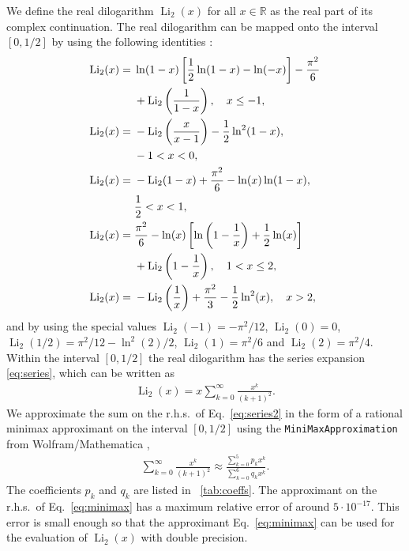 \documentclass[10pt,DIV16,twocolumn,numbers=noenddot]{scrartcl}
\newcommand{\Li}{\operatorname{Li}_2}
\newcommand{\tabref}[1]{\tablename~\ref{#1}}
\begin{document}
We define the real dilogarithm $\Li(x)$ for all $x\in\mathbb{R}$ as
the real part of its complex continuation.  The real dilogarithm can
be mapped onto the interval $[0,1/2]$ by using the following
identities \cite{lewin}:
%
\begin{align}
  \Li(x) ={}& \ln(1-x)\left[\frac{1}{2}\ln(1-x) - \ln(-x)\right] - \frac{\pi^2}{6}
              \notag \\ &+\Li\left(\frac{1}{1-x}\right), \quad x\leq -1, \\
  \Li(x) ={}& -\Li\left(\frac{x}{x-1}\right) - \frac{1}{2}\ln^2(1-x),
              \notag \\ & -1<x<0, \\
  \Li(x) ={}& -\Li(1-x) + \frac{\pi^2}{6} - \ln(x) \ln(1-x),
              \notag \\ &\frac{1}{2}<x<1, \\
  \Li(x) ={}& \frac{\pi^2}{6} - \ln(x)\left[\ln\left(1-\frac{1}{x}\right) + \frac{1}{2}\ln(x)\right]
              \notag \\ &+ \Li\left(1-\frac{1}{x}\right), \quad 1<x\leq 2, \\
  \Li(x) ={}& -\Li\left(\frac{1}{x}\right) + \frac{\pi^2}{3} - \frac{1}{2} \ln^2(x), \quad x>2,
\end{align}
%
and by using the special values $\Li(-1)=-\pi^2/12$, $\Li(0)=0$,
$\Li(1/2)=\pi^2/12-\ln^2(2)/2$, $\Li(1)=\pi^2/6$ and $\Li(2)=\pi^2/4$.
Within the interval $[0,1/2]$ the real dilogarithm has the series
expansion \eqref{eq:series}, which can be written as
%
\begin{align}
  \Li(x) = x \sum_{k=0}^\infty \frac{x^{k}}{(k+1)^2}.
  \label{eq:series2}
\end{align}
%
We approximate the sum on the r.h.s.\ of Eq.~\eqref{eq:series2} in the
form of a rational minimax approximant on the interval $[0,1/2]$ using
the \texttt{MiniMaxApproximation} from Wolfram/Mathematica
\cite{mathematica},
%
\begin{align}
  \sum_{k=0}^\infty \frac{x^{k}}{(k+1)^2} \approx
  \frac{\sum_{k=0}^5 p_kx^k}{\sum_{k=0}^6 q_kx^k}.
  \label{eq:minimax}
\end{align}
%
The coefficients $p_k$ and $q_k$ are listed in \tabref{tab:coeffs}.
The approximant on the r.h.s.\ of Eq.~\eqref{eq:minimax} has a maximum
relative error of around $5\cdot 10^{-17}$.  This error is small
enough so that the approximant Eq.~\eqref{eq:minimax} can be used for
the evaluation of $\Li(x)$ with double precision.
%
\end{document}
